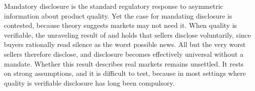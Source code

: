 Mandatory disclosure is the standard regulatory response to asymmetric information about
product quality. Yet the case for mandating disclosure is contested, because theory suggests
markets may not need it. When quality is verifiable, the unraveling result of
\citet{grossman_informational_1981} and \citet{milgrom_good_1981} holds that sellers disclose
voluntarily, since buyers rationally read silence as the worst possible news. All but the very
worst sellers therefore disclose, and disclosure becomes effectively universal without a
mandate. Whether this result describes real markets remains unsettled. It rests on strong
assumptions, and it is difficult to test, because in most settings where quality is verifiable
disclosure has long been compulsory.
